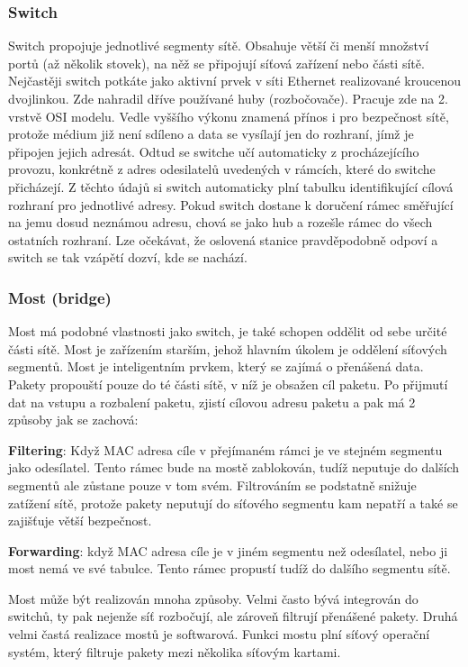 \subsubsection{Switch}
Switch propojuje jednotlivé segmenty sítě. Obsahuje větší či menší množství portů (až několik stovek), na něž se připojují síťová zařízení nebo části sítě.
Nejčastěji switch potkáte jako aktivní prvek v síti Ethernet realizované kroucenou dvojlinkou. Zde nahradil dříve používané huby (rozbočovače). Pracuje zde na 2. vrstvě OSI modelu. Vedle vyššího výkonu znamená přínos i pro bezpečnost sítě, protože médium již není sdíleno a data se vysílají jen do rozhraní, jímž je připojen jejich adresát.
Odtud se switche učí automaticky z procházejícího provozu, konkrétně z adres odesilatelů uvedených v rámcích, které do switche přicházejí. Z těchto údajů si switch automaticky plní tabulku identifikující cílová rozhraní pro jednotlivé adresy. Pokud switch dostane k doručení rámec směřující na jemu dosud neznámou adresu, chová se jako hub a rozešle rámec do všech ostatních rozhraní. Lze očekávat, že oslovená stanice pravděpodobně odpoví a switch se tak vzápětí dozví, kde se nachází.
\subsubsection{Most (bridge)}
Most má podobné vlastnosti jako switch, je také schopen oddělit od sebe určité části sítě. Most je zařízením starším, jehož hlavním úkolem je oddělení síťových segmentů. Most je inteligentním prvkem, který se zajímá o přenášená data. Pakety propouští pouze do té části sítě, v níž je obsažen cíl paketu. Po přijmutí dat na vstupu a rozbalení paketu, zjistí cílovou adresu paketu a pak má 2 způsoby jak se zachová:


\textbf{Filtering}: Když MAC adresa cíle v přejímaném rámci je ve stejném segmentu jako odesílatel. Tento rámec bude na mostě zablokován, tudíž neputuje do dalších segmentů ale zůstane pouze v tom svém. Filtrováním se podstatně snižuje zatížení sítě, protože pakety neputují do síťového segmentu kam nepatří a také se zajišťuje větší bezpečnost.

\textbf{Forwarding}: když MAC adresa cíle je v jiném segmentu než odesílatel, nebo ji most nemá ve své tabulce. Tento rámec propustí tudíž do dalšího segmentu sítě.

Most může být realizován mnoha způsoby. Velmi často bývá integrován do switchů, ty pak nejenže síť rozbočují, ale zároveň filtrují přenášené pakety. Druhá velmi častá realizace mostů je softwarová. Funkci mostu plní síťový operační systém, který filtruje pakety mezi několika síťovým kartami.

